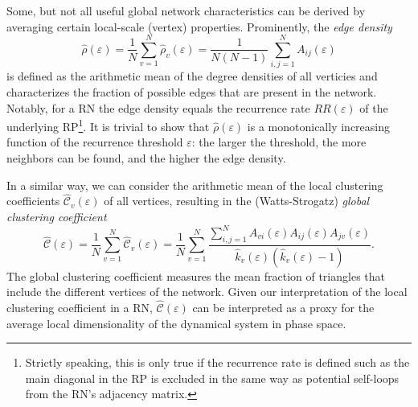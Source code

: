 \documentclass[graybox]{svmult}
\begin{document}
Some, but not all useful global network characteristics can be derived by averaging certain local-scale (vertex) properties. Prominently, the \textit{edge density}
\begin{equation}
\hat{\rho}(\varepsilon)=\frac{1}{N}\sum_{v=1}^N \hat{\rho}_v(\varepsilon)=\frac{1}{N(N-1)} \sum_{i,j=1}^N A_{ij}(\varepsilon)
\label{eq:edgedensity}
\end{equation}
\noindent
is defined as the arithmetic mean of the degree densities of all verticies and characterizes the fraction of possible edges that are present in the network. Notably, for a RN the edge density equals the recurrence rate $RR(\varepsilon)$ of the underlying RP\footnote{Strictly speaking, this is only true if the recurrence rate is defined such as the main diagonal in the RP is excluded in the same way as potential self-loops from the RN's adjacency matrix.}. It is trivial to show that $\hat{\rho}(\varepsilon)$ is a monotonically increasing function of the recurrence threshold $\varepsilon$: the larger the threshold, the more neighbors can be found, and the higher the edge density.

In a similar way, we can consider the arithmetic mean of the local clustering coefficients $\hat{\mathcal{C}}_v(\varepsilon)$ of all vertices, resulting in the (Watts-Strogatz) \textit{global clustering coefficient}~\cite{Watts1998}
\begin{equation}
\hat{\mathcal{C}}(\varepsilon)=\frac{1}{N}\sum_{v=1}^N \hat{\mathcal{C}}_v(\varepsilon)
= \frac{1}{N}\sum_{v=1}^N \frac{\sum_{i,j=1}^N A_{vi}(\varepsilon) A_{ij}(\varepsilon) A_{jv}(\varepsilon)}{\hat{k}_v(\varepsilon)(\hat{k}_v(\varepsilon)-1)}.
\label{eq:globclustering}
\end{equation}
\noindent
The global clustering coefficient measures the mean fraction of triangles that include the different vertices of the network. Given our interpretation of the local clustering coefficient in a RN, $\hat{\mathcal{C}}(\varepsilon)$ can be interpreted as a proxy for the average local dimensionality of the dynamical system in phase space.
\end{document}
